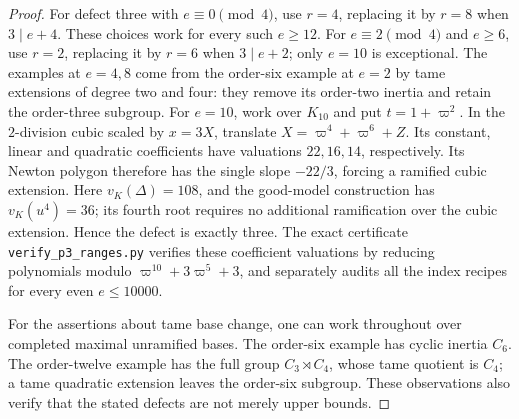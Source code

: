 \begin{proof}
For defect three with $e\equiv0\pmod4$, use $r=4$, replacing it by
$r=8$ when $3\mid e+4$. These choices work for every such $e\geq12$.
For $e\equiv2\pmod4$ and $e\geq6$, use $r=2$, replacing it by
$r=6$ when $3\mid e+2$; only $e=10$ is exceptional.
The examples at $e=4,8$ come from the order-six example at $e=2$
by tame extensions of degree two and four: they remove its order-two
inertia and retain the order-three subgroup.
For $e=10$, work over $K_{10}$ and put $t=1+\varpi^2$.
In the $2$-division cubic scaled by $x=3X$, translate
$X=\varpi^4+\varpi^6+Z$. Its constant, linear and quadratic
coefficients have valuations $22,16,14$, respectively. Its Newton
polygon therefore has the single slope $-22/3$, forcing a ramified
cubic extension. Here $v_K(\Delta)=108$, and the good-model
construction has $v_K(u^4)=36$; its fourth root requires no additional
ramification over the cubic extension. Hence the defect is exactly
three. The exact certificate \texttt{verify\_p3\_ranges.py} verifies these
coefficient valuations by reducing polynomials modulo
$\varpi^{10}+3\varpi^5+3$, and separately audits all the index recipes
for every even $e\leq10000$.

For the assertions about tame base change, one can work throughout
over completed maximal unramified bases. The order-six example has
cyclic inertia $C_6$. The order-twelve example has the full group
$C_3\rtimes C_4$, whose tame quotient is $C_4$; a tame quadratic
extension leaves the order-six subgroup. These observations also
verify that the stated defects are not merely upper bounds.
\end{proof}


